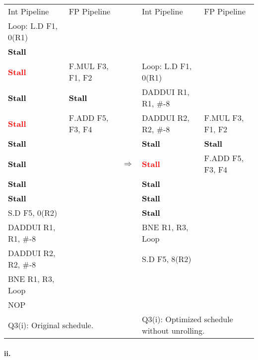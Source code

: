 \documentclass[11pt]{article}
\renewcommand{\part}[1]{\paragraph*{{#1}.}}
\newcommand{\code}[1]{\textsf{#1}}
\newcommand{\stall}{\textcolor{red}{\textbf{Stall}}}
\newcommand{\cellstall}{\cellcolor{red!25}\textcolor{black}{\textbf{Stall}}}
\begin{document}
\begin{table}[h]
\begin{tabular}{llcll}
	 Int Pipeline & FP Pipeline & & Int Pipeline & FP Pipeline \\
	 \code{Loop:} \code{L.D F1, 0(R1)} &  & & & \\
	 \cellstall &  & & & \\
	 \stall & \code{F.MUL F3, F1, F2} & & \code{Loop:} \code{L.D F1, 0(R1)} &  \\
	 \cellstall & \cellstall & & \code{DADDUI R1, R1, \#-8} &  \\
	 \stall & \code{F.ADD F5, F3, F4} & & \code{DADDUI R2, R2, \#-8} & \code{F.MUL F3, F1, F2} \\
	 \cellstall &  & & \cellstall & \cellstall \\
	 \cellstall &  & $\Rightarrow$ & \stall & \code{F.ADD F5, F3, F4} \\
	 \cellstall &  & & \cellstall &  \\
	 \cellstall &  & &  \cellstall &   \\
	 \code{S.D F5, 0(R2)} &  & & \cellstall &  \\
	 \code{DADDUI R1, R1, \#-8} &  & &  \code{BNE R1, R3, Loop} &  \\
	 \code{DADDUI R2, R2, \#-8} &  & &  \code{S.D F5, 8(R2)} &  \\
	 \code{BNE R1, R3, Loop}  &  & &  &  \\
	 \code{NOP} &  & & & \\
	 \multicolumn{2}{l}{Q3(i): Original schedule.} & & \multicolumn{2}{l}{Q3(i): Optimized schedule without unrolling.} 
\end{tabular}
\label{tbl:q3-p1}
\end{table}


\part{ii} 
\end{document}
